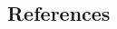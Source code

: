 \documentclass[a0,landscape]{a0poster}
\begin{document}
\begin{multicols}{3}
\small{\section*{\color{uwred}References}}


\nocite{*} %



\end{multicols}
\end{document}
